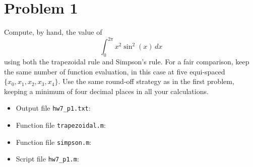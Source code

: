 \section{Problem 1}%
\label{sec:problem_1}
Compute, by hand, the value of
\begin{equation*}
  \int_{0}^{2 \pi} x^{2} \sin^{2}(x) \, dx
\end{equation*}
using both the trapezoidal rule and Simpson's rule. For a fair comparison, keep the same number of function evaluation,  in this case at five equi-spaced $\{x_{0}, x_{1}, x_{2}, x_{3}, x_{4}\}$. Use the same round-off strategy as in the first problem, keeping a minimum of four decimal places in all your calculations.
\begin{solution}
  \quad
  \begin{itemize}
    \item Output file \verb|hw7_p1.txt|:
      
    \item Function file \verb|trapezoidal.m|:
      
    \item Function file \verb|simpson.m|:
      
    \item Script file \verb|hw7_p1.m|:
      
  \end{itemize}
\end{solution}


